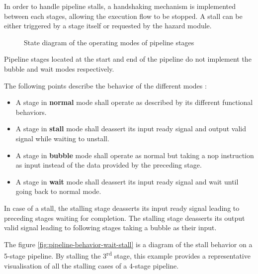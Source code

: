       \label{pipeline-stall}

      \begin{content}
          In order to handle pipeline stalls, a handshaking mechanism is implemented between each stages, allowing the execution flow to be stopped. A stall can be either triggered by a stage itself or requested by the hazard module.
        \end{content}

      \begin{figure}[H]
          \centering
          
          \caption{State diagram of the operating modes of pipeline stages}
          \label{fig:pipeline-stage-state}
        \end{figure}

      \begin{content}
          Pipeline stages located at the start and end of the pipeline do not implement the bubble and wait modes respectively.
          
          The following points describe the behavior of the different modes :
          \begin{itemize}
              \item A stage in \textbf{normal} mode shall operate as described by its different functional behaviors.
              \item A stage in \textbf{stall} mode shall deassert its input ready signal and output valid signal while waiting to unstall.
              \item A stage in \textbf{bubble} mode shall operate as normal but taking a nop instruction as input instead of the data provided by the preceding stage.
              \item A stage in \textbf{wait} mode shall deassert its input ready signal and wait until going back to normal mode.
            \end{itemize}
          
          In case of a stall, the stalling stage deasserts its input ready signal leading to preceding stages waiting for completion. The stalling stage deasserts its output valid signal leading to following stages taking a bubble as their input.

          The figure \ref{fig:pipeline-behavior-wait-stall} is a diagram of the stall behavior on a 5-stage pipeline. By stalling the 3\textsuperscript{rd} stage, this example provides a representative visualisation of all the stalling cases of a 4-stage pipeline.
        \end{content}

